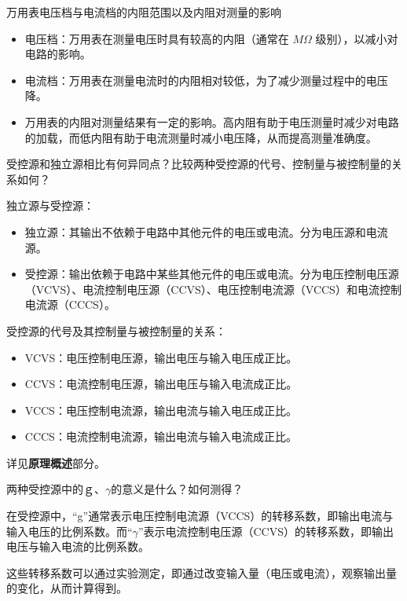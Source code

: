\documentclass[dvipsnames, svgnames,a4paper,11pt]{article}
\begin{document}
	\begin{question}
		万用表电压档与电流档的内阻范围以及内阻对测量的影响
	\end{question}
	\begin{itemize}
		\item 电压档：万用表在测量电压时具有较高的内阻（通常在 \(M\Omega\) 级别），以减小对电路的影响。
		\item 电流档：万用表在测量电流时的内阻相对较低，为了减少测量过程中的电压降。
		\item 万用表的内阻对测量结果有一定的影响。高内阻有助于电压测量时减少对电路的加载，而低内阻有助于电流测量时减小电压降，从而提高测量准确度。
	\end{itemize}
	
	\begin{question}
		受控源和独立源相比有何异同点？比较两种受控源的代号、控制量与被控制量的关系如何？
	\end{question}
	独立源与受控源：
	\begin{itemize}
		\item 独立源：其输出不依赖于电路中其他元件的电压或电流。分为电压源和电流源。
		\item 受控源：输出依赖于电路中某些其他元件的电压或电流。分为电压控制电压源（VCVS）、电流控制电压源（CCVS）、电压控制电流源（VCCS）和电流控制电流源（CCCS）。
	\end{itemize}
	
	受控源的代号及其控制量与被控制量的关系：
	\begin{itemize}
		\item VCVS：电压控制电压源，输出电压与输入电压成正比。
		\item CCVS：电流控制电压源，输出电压与输入电流成正比。
		\item VCCS：电压控制电流源，输出电流与输入电压成正比。
		\item CCCS：电流控制电流源，输出电流与输入电流成正比。
	\end{itemize}
	
	详见\textbf{原理概述}部分。
	
	\begin{question}
		两种受控源中的ｇ、$\gamma$的意义是什么？如何测得？
	\end{question}
	在受控源中，“g”通常表示电压控制电流源（VCCS）的转移系数，即输出电流与输入电压的比例系数。而“$\gamma$”表示电流控制电压源（CCVS）的转移系数，即输出电压与输入电流的比例系数。
	
	这些转移系数可以通过实验测定，即通过改变输入量（电压或电流），观察输出量的变化，从而计算得到。
	
\end{document}
